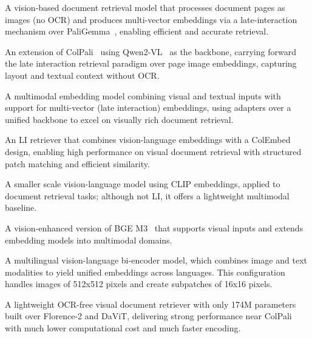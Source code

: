 A vision-based document retrieval model that processes document pages as images (no OCR) and produces multi-vector embeddings via a late-interaction mechanism over PaliGemma~\citep{beyer2024paligemmaversatile3bvlm}, enabling efficient and accurate retrieval.

An extension of ColPali~\citep{faysse2025colpaliefficientdocumentretrieval} using Qwen2-VL~\citep{wang2024qwen2vlenhancingvisionlanguagemodels} as the backbone, carrying forward the late interaction retrieval paradigm over page image embeddings, capturing layout and textual context without OCR.

A multimodal embedding model combining visual and textual inputs with support for multi-vector (late interaction) embeddings, using adapters over a unified backbone to excel on visually rich document retrieval.

An LI retriever that combines vision-language embeddings with a ColEmbed design, enabling high performance on visual document retrieval with structured patch matching and efficient similarity.

A smaller scale vision-language model using CLIP embeddings, applied to document retrieval tasks; although not LI, it offers a lightweight multimodal baseline.

A vision-enhanced version of BGE M3~\citep{chen_bge_2024} that supports visual inputs and extends embedding models into multimodal domains.

A multilingual vision-language bi-encoder model, which combines image and text modalities to yield unified embeddings across languages. This configuration handles images of 512x512 pixels and create subpatches of 16x16 pixels.

A lightweight OCR-free visual document retriever with only 174M parameters built over Florence-2 and DaViT, delivering strong performance near ColPali with much lower computational cost and much faster encoding.



